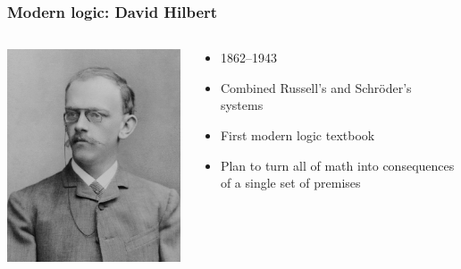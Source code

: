\begin{frame}
  \frametitle{Modern logic: David Hilbert}

  \begin{columns}
    \begin{column}{.5\textwidth}
      \includegraphics[width=\textwidth]{../assets/hilbert}
    \end{column}
    \begin{column}{.5\textwidth}
      \begin{itemize}
        \item 1862--1943
        \item Combined Russell's and Schr\"oder's systems
        \item First modern logic textbook
        \item Plan to turn all of math into consequences of a single set of premises
      \end{itemize}
    \end{column}
  \end{columns}
\end{frame}

